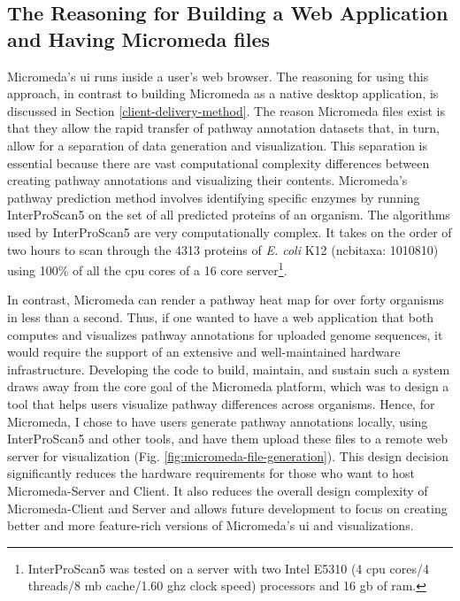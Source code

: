 \subsection{The Reasoning for Building a Web Application and Having Micromeda 
files} \label{why-micromeda-files}

Micromeda's \gls{ui} runs inside a user's web browser. The reasoning for using 
this approach, in contrast to building Micromeda as a native desktop 
application, is discussed in Section \ref{client-delivery-method}. The reason 
Micromeda files exist is that they allow the rapid transfer of pathway 
annotation datasets that, in turn, allow for a separation of data generation and 
visualization. This separation is essential because there are vast computational 
complexity differences between creating pathway annotations and visualizing 
their contents. Micromeda's pathway prediction method involves identifying 
specific enzymes by running InterProScan5 on the set of all predicted proteins 
of an organism. The algorithms used by InterProScan5 are very computationally 
complex. It takes on the order of two hours to scan through the 4313 proteins of 
\textit{E. coli} K12 (\gls{ncbitaxa}: 1010810) using 100\% of all the \gls{cpu} 
cores of a 16 core server\footnote{InterProScan5 was tested on a server with two 
Intel E5310 (4 \gls{cpu} cores/4 threads/8 \gls{mb} cache/1.60 \gls{ghz} clock 
speed) processors and 16 \gls{gb}  of \gls{ram}.}.

In contrast, Micromeda can render a pathway heat map for over forty organisms in 
less than a second. Thus, if one wanted to have a web application that both 
computes and visualizes pathway annotations for uploaded genome sequences, it 
would require the support of an extensive and well-maintained hardware 
infrastructure. Developing the code to build, maintain, and sustain such a 
system draws away from the core goal of the Micromeda platform, which was to 
design a tool that helps users visualize pathway differences across organisms. 
Hence, for Micromeda, I chose to have users generate pathway annotations 
locally, using InterProScan5 and other tools, and have them upload these files 
to a remote web server for visualization (Fig. 
\ref{fig:micromeda-file-generation}). This design decision significantly reduces 
the hardware requirements for those who want to host Micromeda-Server and 
Client. It also reduces the overall design complexity of Micromeda-Client and 
Server and allows future development to focus on creating better and more 
feature-rich versions of Micromeda's \gls{ui} and visualizations.

